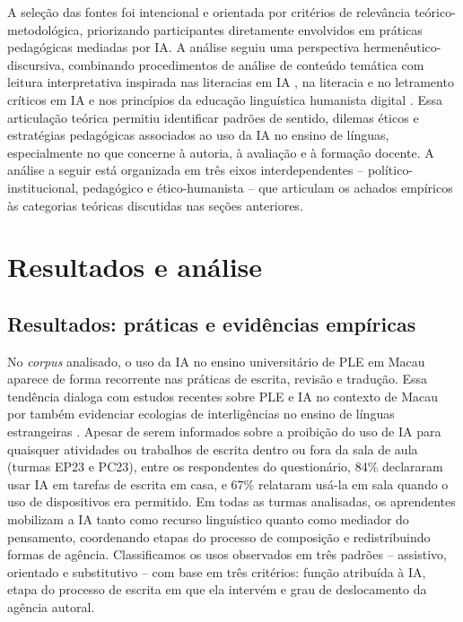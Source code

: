 \documentclass[portuguese]{textolivre}
\begin{document}
A seleção das fontes foi intencional e orientada por critérios de relevância teórico-metodológica, priorizando participantes diretamente envolvidos em práticas pedagógicas mediadas por IA. A análise seguiu uma perspectiva hermenêutico-discursiva, combinando procedimentos de análise de conteúdo temática com leitura interpretativa inspirada nas literacias em IA \cite{LongMagerko2020}, na literacia e no letramento críticos em IA \cite{FarazouliEtAl2024, SperlingEtAl2024, RoeEtAl2025} e nos princípios da educação linguística humanista digital \cite{PiresAmaro2025}. Essa articulação teórica permitiu identificar padrões de sentido, dilemas éticos e estratégias pedagógicas associados ao uso da IA no ensino de línguas, especialmente no que concerne à autoria, à avaliação e à formação docente. A análise a seguir está organizada em três eixos interdependentes – político-institucional, pedagógico e ético-humanista – que articulam os achados empíricos às categorias teóricas discutidas nas seções anteriores.


\section{Resultados e análise}\label{sec-resul}

\subsection{Resultados: práticas e evidências empíricas}\label{sec-resul-prat}
No \textit{corpus} analisado, o uso da IA no ensino universitário de PLE em Macau aparece de forma recorrente nas práticas de escrita, revisão e tradução. Essa tendência dialoga com estudos recentes sobre PLE e IA no contexto de Macau por também evidenciar ecologias de interligências no ensino de línguas estrangeiras \cite{AmaroPires2024, PiresAmaro2025}. Apesar de serem informados sobre a proibição do uso de IA para quaisquer atividades ou trabalhos de escrita dentro ou fora da sala de aula (turmas EP23 e PC23), entre os respondentes do questionário, 84\% declararam usar IA em tarefas de escrita em casa, e 67\% relataram usá-la em sala quando o uso de dispositivos era permitido. Em todas as turmas analisadas, os aprendentes mobilizam a IA tanto como recurso linguístico quanto como mediador do pensamento, coordenando etapas do processo de composição e redistribuindo formas de agência. Classificamos os usos observados em três padrões – assistivo, orientado e substitutivo – com base em três critérios: função atribuída à IA, etapa do processo de escrita em que ela intervém e grau de deslocamento da agência autoral.
\end{document}
